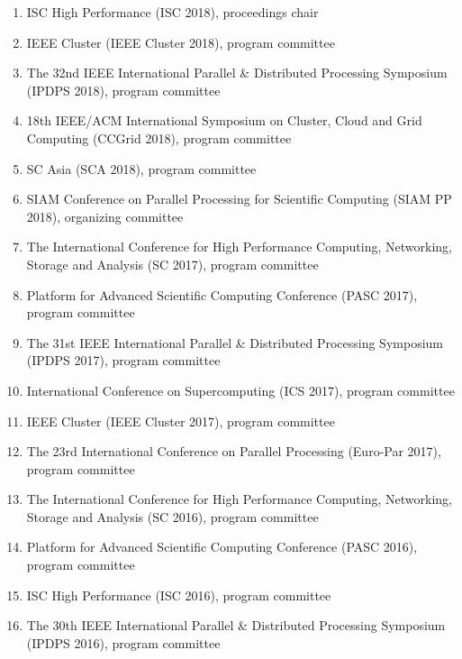 \documentclass[margin,line]{cv}
\begin{document}
\begin{resume}
\begin{enumerate}
\item ISC High Performance (ISC 2018), proceedings chair

\item IEEE Cluster (IEEE Cluster 2018), program committee

\item The 32nd IEEE International Parallel \& Distributed Processing Symposium (IPDPS 2018), program committee

\item 18th IEEE/ACM International Symposium on Cluster, Cloud and Grid Computing (CCGrid 2018), program committee

\item SC Asia (SCA 2018), program committee

\item SIAM Conference on Parallel Processing for Scientific Computing (SIAM PP 2018), organizing committee

\item The International Conference for High Performance Computing, Networking, Storage and Analysis (SC 2017), program committee

\item Platform for Advanced Scientific Computing Conference (PASC 2017), program committee

\item The 31st IEEE International Parallel \& Distributed Processing Symposium (IPDPS 2017), program committee

\item International Conference on Supercomputing (ICS 2017), program committee

\item IEEE Cluster (IEEE Cluster 2017), program committee

\item The 23rd International Conference on Parallel Processing (Euro-Par 2017), program committee

\item The International Conference for High Performance Computing, Networking, Storage and Analysis (SC 2016), program committee

\item Platform for Advanced Scientific Computing Conference (PASC 2016), program committee

\item ISC High Performance (ISC 2016), program committee

\item The 30th IEEE International Parallel \& Distributed Processing Symposium (IPDPS 2016), program committee


\end{enumerate}
\end{resume}
\end{document}
